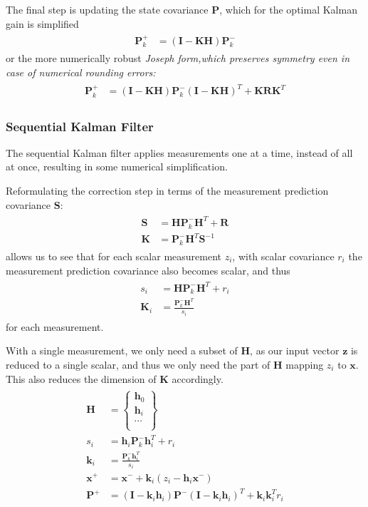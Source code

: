 \documentclass[12pt,a4paper,oneside,openany]{article}
\newcommand{\vx}{\ensuremath{\mathbf{x}}}
\newcommand{\vz}{\ensuremath{\mathbf{z}}}
\newcommand{\vh}{\ensuremath{\mathbf{h}}}
\newcommand{\vk}{\ensuremath{\mathbf{k}}}
\newcommand{\mH}{\ensuremath{\mathbf{H}}}
\newcommand{\mK}{\ensuremath{\mathbf{K}}}
\newcommand{\mP}{\ensuremath{\mathbf{P}}}
\newcommand{\mR}{\ensuremath{\mathbf{R}}}
\newcommand{\mS}{\ensuremath{\mathbf{S}}}
\newcommand{\mI}{\ensuremath{\mathbf{I}}}
\begin{document}
The final step is updating the state covariance $\mP$, which for the optimal Kalman gain is simplified
\begin{gather}
\begin{aligned}
\mP^+_k &= \left( \mI - \mK \mH \right) \mP^-_k
\end{aligned}
\end{gather}
or the more numerically robust \em Joseph form,\em which preserves symmetry even in case of numerical rounding errors:
\begin{gather}
\begin{aligned}
\mP^+_k &= \left( \mI - \mK \mH \right) \mP^-_k \left( \mI - \mK \mH \right)^T + \mK \mR \mK^T
\end{aligned}
\end{gather}


\subsubsection{Sequential Kalman Filter}

The sequential Kalman filter applies measurements one at a time, instead of all at once, resulting in some numerical simplification.

Reformulating the correction step in terms of the measurement prediction covariance $\mS$:
\begin{gather}
\begin{aligned}
\mS &= \mH \mP^-_k \mH^T + \mR \\
\mK &= \mP^-_k\mH^T \mS^{-1}
\end{aligned}
\end{gather}
allows us to see that for each scalar measurement $z_i$, with scalar covariance $r_i$ the measurement prediction covariance also becomes scalar, and thus
\begin{gather}
\begin{aligned}
s_i &= \mH \mP^-_k \mH^T + r_i \\
\mK_i &= \frac{\mP^-_k\mH^T}{s_i}
\end{aligned}
\end{gather}
for each measurement.

With a single measurement, we only need a subset of $\mH$, as our input vector $\vz$ is reduced to a single scalar, and thus we only need the part of $\mH$ mapping $z_i$ to $\vx$. This also reduces the dimension of $\mK$ accordingly.
\begin{gather}
\begin{aligned}
\mH &= \left\{ \begin{array}{c} \vh_0 \\
\vh_i \\
\cdots \\
\end{array} \right\} \\
s_i &= \vh_i \mP^-_k \vh_i^T + r_i \\
\vk_i &= \frac{\mP^-_k \vh_i^T}{s_i} \\
\vx^+ &= \vx^- + \vk_i \left(z_{i} - \vh_i \vx^- \right) \\
\mP^+ &= \left( \mI - \vk_i \vh_i \right) \mP^- \left( \mI - \vk_i \vh_i \right)^T + \vk_i \vk_i^T r_i
\end{aligned}
\end{gather}
\end{document}
